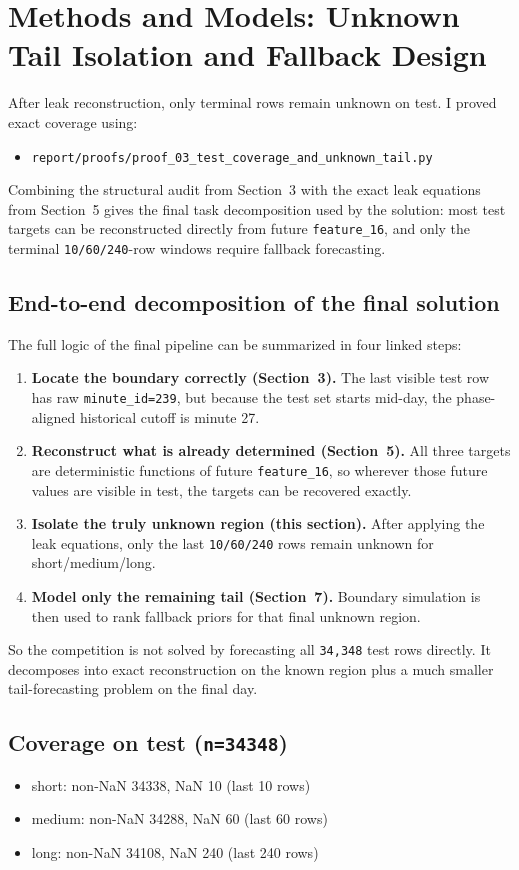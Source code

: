 \section{Methods and Models: Unknown Tail Isolation and Fallback Design}

After leak reconstruction, only terminal rows remain unknown on test. I proved exact coverage using:
\begin{itemize}[leftmargin=1.5em]
  \item \texttt{report/proofs/proof\_03\_test\_coverage\_and\_unknown\_tail.py}
\end{itemize}
Combining the structural audit from Section~3 with the exact leak equations from Section~5 gives the final task decomposition used by the solution: most test targets can be reconstructed directly from future \texttt{feature\_16}, and only the terminal \texttt{10/60/240}-row windows require fallback forecasting.

\subsection{End-to-end decomposition of the final solution}
The full logic of the final pipeline can be summarized in four linked steps:
\begin{enumerate}[leftmargin=1.5em]
  \item \textbf{Locate the boundary correctly (Section~3).} The last visible test row has raw \texttt{minute\_id=239}, but because the test set starts mid-day, the phase-aligned historical cutoff is minute 27.
  \item \textbf{Reconstruct what is already determined (Section~5).} All three targets are deterministic functions of future \texttt{feature\_16}, so wherever those future values are visible in test, the targets can be recovered exactly.
  \item \textbf{Isolate the truly unknown region (this section).} After applying the leak equations, only the last \texttt{10/60/240} rows remain unknown for short/medium/long.
  \item \textbf{Model only the remaining tail (Section~7).} Boundary simulation is then used to rank fallback priors for that final unknown region.
\end{enumerate}
So the competition is not solved by forecasting all \texttt{34{,}348} test rows directly. It decomposes into exact reconstruction on the known region plus a much smaller tail-forecasting problem on the final day.

\subsection{Coverage on test (\texttt{n=34348})}
\begin{itemize}[leftmargin=1.5em]
  \item short: non-NaN 34338, NaN 10 (last 10 rows)
  \item medium: non-NaN 34288, NaN 60 (last 60 rows)
  \item long: non-NaN 34108, NaN 240 (last 240 rows)
\end{itemize}

